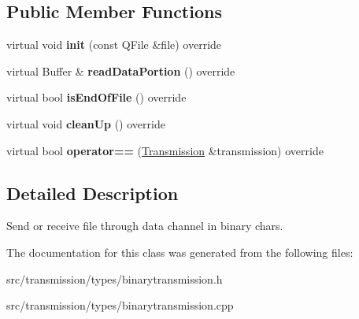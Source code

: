 \subsection*{Public Member Functions}
\begin{DoxyCompactItemize}
\item 
\mbox{\label{classBinaryTransmission_a48d357cdabd764fcb86022335d07c2ba}} 
virtual void {\bfseries init} (const Q\+File \&file) override
\item 
\mbox{\label{classBinaryTransmission_a319cefe379f2ae1cd069770b4aa9c765}} 
virtual Buffer \& {\bfseries read\+Data\+Portion} () override
\item 
\mbox{\label{classBinaryTransmission_a639b12864309903735be1f4218020a7f}} 
virtual bool {\bfseries is\+End\+Of\+File} () override
\item 
\mbox{\label{classBinaryTransmission_a009c962a3e275bc0e78157e3e208e31b}} 
virtual void {\bfseries clean\+Up} () override
\item 
\mbox{\label{classBinaryTransmission_a091cecfcaca86cb7d4bd319b54723518}} 
virtual bool {\bfseries operator==} (\hyperlink{classTransmission}{Transmission} \&transmission) override
\end{DoxyCompactItemize}


\subsection{Detailed Description}
Send or receive file through data channel in binary chars. 

The documentation for this class was generated from the following files\+:\begin{DoxyCompactItemize}
\item 
src/transmission/types/binarytransmission.\+h\item 
src/transmission/types/binarytransmission.\+cpp\end{DoxyCompactItemize}

